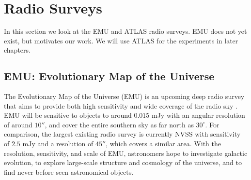 
    \section{Radio Surveys}
    \label{sec:radio-surveys}

        In this section we look at the EMU and ATLAS radio surveys. EMU does not
        yet exist, but motivates our work. We will use ATLAS for the experiments
        in later chapters.

        \subsection{EMU: Evolutionary Map of the Universe}
        \label{sec:emu}


            The Evolutionary Map of the Universe (EMU) is an upcoming deep radio
            survey that aims to provide both high sensitivity and wide coverage
            of the radio sky \citep{norris11}. EMU will be sensitive to objects
            to around $0.015$ mJy with an angular resolution of around $10''$,
            and cover the entire southern sky as far north as $30^\circ$. For
            comparison, the largest existing radio survey is currently NVSS
            \citep{condon98} with sensitivity of $2.5$ mJy and a resolution of
            $45''$, which covers a similar area. With the resolution,
            sensitivity, and scale of EMU, astronomers hope to investigate
            galactic evolution, to explore large-scale structure and cosmology
            of the universe, and to find never-before-seen astronomical objects.

